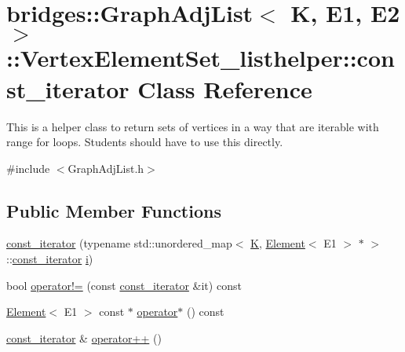 \hypertarget{classbridges_1_1_graph_adj_list_1_1_vertex_element_set__listhelper_1_1const__iterator}{}\section{bridges\+:\+:Graph\+Adj\+List$<$ K, E1, E2 $>$\+:\+:Vertex\+Element\+Set\+\_\+listhelper\+:\+:const\+\_\+iterator Class Reference}
\label{classbridges_1_1_graph_adj_list_1_1_vertex_element_set__listhelper_1_1const__iterator}


This is a helper class to return sets of vertices in a way that are iterable with range for loops. Students should have to use this directly.  




{\ttfamily \#include $<$Graph\+Adj\+List.\+h$>$}

\subsection*{Public Member Functions}
\begin{DoxyCompactItemize}
\item 
\hyperlink{classbridges_1_1_graph_adj_list_1_1_vertex_element_set__listhelper_1_1const__iterator_a6df7b33e5e32f87ab2c6a9b41939d6ae}{const\+\_\+iterator} (typename std\+::unordered\+\_\+map$<$ \hyperlink{namespacebridges_acfb0a4f7877d8f63de3e6862004c50edaa5f3c6a11b03839d46af9fb43c97c188}{K}, \hyperlink{classbridges_1_1_element}{Element}$<$ E1 $>$ $\ast$ $>$\+::\hyperlink{classbridges_1_1_graph_adj_list_1_1_vertex_element_set__listhelper_1_1const__iterator}{const\+\_\+iterator} \hyperlink{namespacebridges_acfb0a4f7877d8f63de3e6862004c50eda865c0c0b4ab0e063e5caa3387c1a8741}{i})
\item 
bool \hyperlink{classbridges_1_1_graph_adj_list_1_1_vertex_element_set__listhelper_1_1const__iterator_adec12879bc99de5fbeaa4b528f0479dc}{operator!=} (const \hyperlink{classbridges_1_1_graph_adj_list_1_1_vertex_element_set__listhelper_1_1const__iterator}{const\+\_\+iterator} \&it) const
\item 
\hyperlink{classbridges_1_1_element}{Element}$<$ E1 $>$ const  $\ast$ \hyperlink{classbridges_1_1_graph_adj_list_1_1_vertex_element_set__listhelper_1_1const__iterator_a5c76de8819e57bc887a08c994ac30392}{operator$\ast$} () const
\item 
\hyperlink{classbridges_1_1_graph_adj_list_1_1_vertex_element_set__listhelper_1_1const__iterator}{const\+\_\+iterator} \& \hyperlink{classbridges_1_1_graph_adj_list_1_1_vertex_element_set__listhelper_1_1const__iterator_a44523a95bdf756876509aef9fb79db73}{operator++} ()
\end{DoxyCompactItemize}


